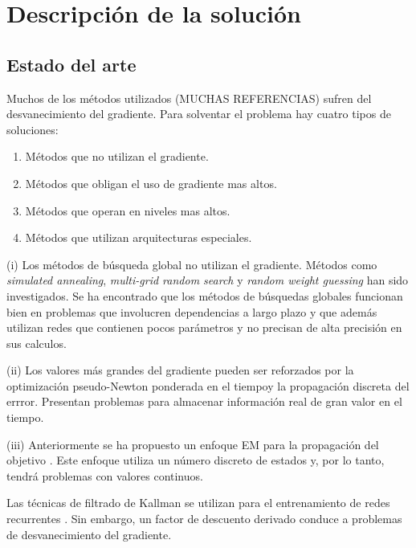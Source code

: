 \section{Descripción de la solución}
\begin{comment}
En la presente sección se describe el estado del arte y las características de la solución. Se explicara cual es el propósito de la solución, y posteriormente los alcances y limitaciones establecidas.
\end{comment}

\subsection{Estado del arte}
Muchos de los métodos utilizados (MUCHAS REFERENCIAS) sufren del desvanecimiento del gradiente. Para solventar el problema hay cuatro tipos de soluciones:
\begin{enumerate}
	\item Métodos que no utilizan el gradiente.
	\item Métodos que obligan el uso de gradiente mas altos.
	\item Métodos que operan en niveles mas altos.
	\item Métodos que utilizan arquitecturas especiales.
\end{enumerate}

(i) Los métodos de búsqueda global no utilizan el gradiente. Métodos como {\em simulated annealing}, {\em multi-grid random search} \cite{Bengio1994} y {\em random weight guessing} \cite{Schmidhuber1996} han sido investigados. Se ha encontrado que los métodos de búsquedas globales funcionan bien en problemas que involucren dependencias a largo plazo y que además utilizan redes que contienen pocos parámetros y no precisan de alta precisión en sus calculos.

(ii) Los valores más grandes del gradiente pueden ser reforzados por la optimización pseudo-Newton ponderada en el tiempoy la propagación discreta del errror. Presentan problemas para almacenar información real de gran valor en el tiempo.

(iii) Anteriormente se ha propuesto un enfoque EM para la propagación del objetivo \cite{Bengio1993}. Este enfoque utiliza un número discreto de estados y, por lo tanto, tendrá problemas con valores continuos.

Las técnicas de filtrado de Kallman se utilizan para el entrenamiento de redes recurrentes \cite{Puskorius1994}. Sin embargo, un factor de descuento derivado conduce a problemas de desvanecimiento del gradiente.

